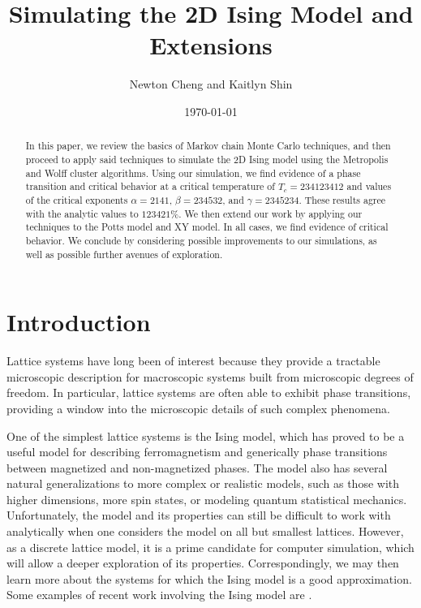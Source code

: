 \documentclass[twocolumn,aps]{revtex4-1} %
\begin{document}
\title{Simulating the 2D Ising Model and Extensions}

\author{Newton Cheng and Kaitlyn Shin}

\date{\today}
\begin{abstract}
In this paper, we review the basics of Markov chain Monte Carlo techniques, and then proceed to apply said techniques to simulate the 2D Ising model using the Metropolis and Wolff cluster algorithms. Using our simulation, we find evidence of a phase transition and critical behavior at a critical temperature of $T_c = 234123412$ and values of the critical exponents $\alpha = 2141$, $\beta = 234532$, and $\gamma = 2345234$. These results agree with the analytic values to $123421\%$. We then extend our work by applying our techniques to the Potts model and XY model. In all cases, we find evidence of critical behavior. We conclude by considering possible improvements to our simulations, as well as possible further avenues of exploration.
\end{abstract}

\maketitle
\section{Introduction}
Lattice systems have long been of interest because they provide a tractable microscopic description for macroscopic systems built from microscopic degrees of freedom. In particular, lattice systems are often able to exhibit phase transitions, providing a window into the microscopic details of such complex phenomena. 

One of the simplest lattice systems is the Ising model, which has proved to be a useful model for describing ferromagnetism and generically phase transitions between magnetized and non-magnetized phases. The model also has several natural generalizations to more complex or realistic models, such as those with higher dimensions, more spin states, or modeling quantum statistical mechanics. Unfortunately, the model and its properties can still be difficult to work with analytically when one considers the model on all but smallest lattices. However, as a discrete lattice model, it is a prime candidate for computer simulation, which will allow a deeper exploration of its properties. Correspondingly, we may then learn more about the systems for which the Ising model is a good approximation. Some examples of recent work involving the Ising model are \cite{1,2, 3,4}.
\end{document}
